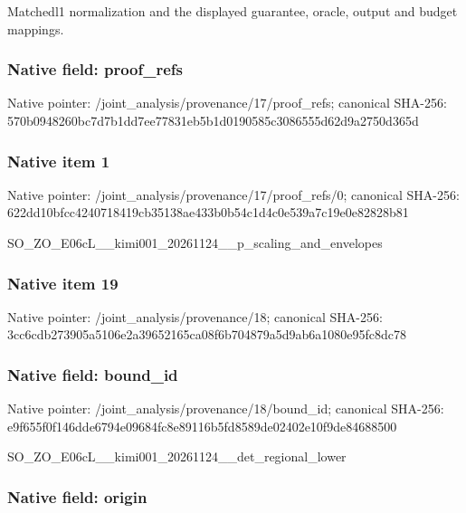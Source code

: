 \documentclass[10pt,a4paper]{article}
\begin{document}
Matchedl1 normalization and the displayed guarantee, oracle, output and budget mappings.


\subsubsection{Native field: proof\_refs}


Native pointer: /joint\_analysis/provenan\allowbreak{}ce/17/proof\_refs; canonical SHA-256: 570b0948260bc7d7b1dd7ee7\allowbreak{}7831eb5b1d0190585c308655\allowbreak{}5d62d9a2750d365d



\subsubsection{Native item 1}


Native pointer: /joint\_analysis/provenan\allowbreak{}ce/17/proof\_refs/0; canonical SHA-256: 622dd10bfcc4240718419cb3\allowbreak{}5138ae433b0b54c1d4c0e539\allowbreak{}a7c19e0e82828b81


SO\_ZO\_E06cL\_\_kimi001\_202\allowbreak{}61124\_\_p\_scaling\_and\_env\allowbreak{}elopes


\subsubsection{Native item 19}


Native pointer: /joint\_analysis/provenance/18; canonical SHA-256: 3cc6cdb273905a5106e2a396\allowbreak{}52165ca08f6b704879a5d9ab\allowbreak{}6a1080e95fc8dc78



\subsubsection{Native field: bound\_id}


Native pointer: /joint\_analysis/provenance/18/bound\_id; canonical SHA-256: e9f655f0f146dde6794e0968\allowbreak{}4fc8e89116b5fd8589de0240\allowbreak{}2e10f9de84688500


SO\_ZO\_E06cL\_\_kimi001\_202\allowbreak{}61124\_\_det\_regional\_lowe\allowbreak{}r


\subsubsection{Native field: origin}
\end{document}
